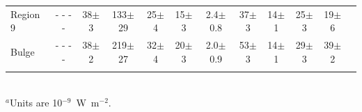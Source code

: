 \begin{table}
\begin{minipage}{200mm}
\begin{tabular}{l c c  c  c  c  c  c  c  c  c c }
Region 9 &  - - - -                     & 38$\pm$3          & 133$\pm$29        & 25$\pm$4        & 15$\pm$3            & 2.4$\pm$0.8        & 37$\pm$3               & 14$\pm$1             & 25$\pm$3        & 19$\pm$6        \\
Bulge       & - - - -                       & 38$\pm$2           & 219$\pm$27        & 32$\pm$4        & 20$\pm$3           & 2.0$\pm$0.9        & 53$\pm$3              & 14$\pm$1           & 29$\pm$3        & 39$\pm$2       \\
\hline
 \label{PAHlinetable}
\end{tabular}\\
{$^a$Units are 10$^{-9}$~W~m$^{-2}$.}
\end{minipage}
\end{table}







